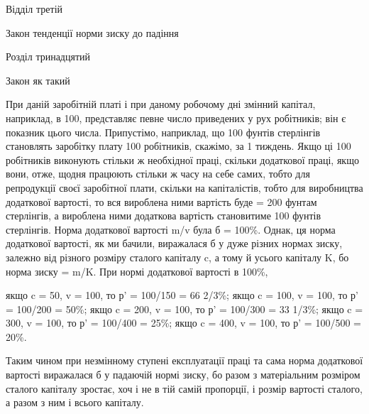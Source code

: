 
Відділ третій

Закон тенденції норми зиску до падіння

Розділ тринадцятий

Закон як такий

При даній заробітній платі і при даному робочому дні змінний
капітал, наприклад, в 100, представляє певне число приведених
у рух робітників; він є показник цього числа. Припустімо,
наприклад, що 100 фунтів стерлінгів становлять заробітку плату
100 робітників, скажімо, за 1 тиждень. Якщо ці 100 робітників
виконують стільки ж необхідної праці, скільки додаткової праці,
якщо вони, отже, щодня працюють стільки ж часу на себе
самих, тобто для репродукції своєї заробітної плати, скільки
на капіталістів, тобто для виробництва додаткової вартості, то
вся вироблена ними вартість буде = 200 фунтам стерлінгів,
а вироблена ними додаткова вартість становитиме 100 фунтів
стерлінгів. Норма додаткової вартості m/v була б = 100\%. Однак,
ця норма додаткової вартості, як ми бачили, виражалася б у дуже
різних нормах зиску, залежно від різного розміру сталого капіталу
c, а тому й усього капіталу K, бо норма зиску = m/K. При нормі
додаткової вартості в 100\%,

якщо c = 50, v = 100, то р' = 100/150 = 66 2/3\%;
якщо c = 100, v = 100, то р' = 100/200 = 50\%;
якщо c = 200, v = 100, то р' = 100/300 = 33 1/3\%;
якщо c = 300, v = 100, то р' = 100/400 = 25\%;
якщо c = 400, v = 100, то р' = 100/500 = 20\%.

Таким чином при незмінному ступені експлуатації праці та
сама норма додаткової вартості виражалася б у падаючій нормі
зиску, бо разом з матеріальним розміром сталого капіталу зростає,
хоч і не в тій самій пропорції, і розмір вартості сталого,
а разом з ним і всього капіталу.

